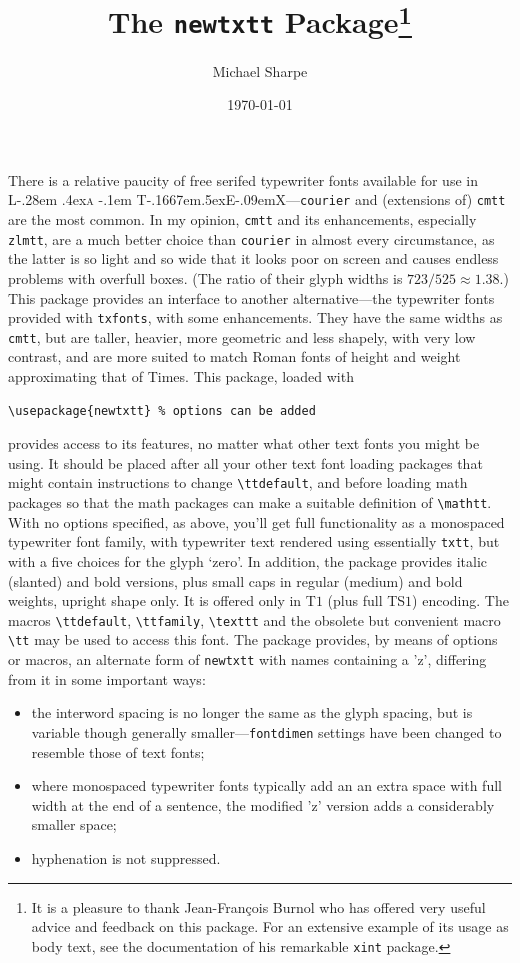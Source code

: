 \documentclass[11pt]{article}
\title{The \texttt{newtxtt} Package\thanks{It is a pleasure to thank Jean-Fran\c{c}ois Burnol who has offered very useful advice and feedback on this package. For an extensive example of its usage as body text, see  the documentation of his remarkable {\tt xint} package.}
}
\author{Michael Sharpe}
\date{\today}  %
\makeatletter
\def\TeX{T\kern-.1667em\lower.5ex\hbox{E}\kern-.09emX\@}
\DeclareRobustCommand{\LaTeX}{L\kern-.28em%
\raise.4ex\hbox{\textsc{a}}%
        \kern-.1em%
        \TeX}
\makeatother
\begin{document}
\maketitle
There is a relative paucity of free serifed typewriter fonts available for use  in \LaTeX---{\tt courier}
 and (extensions of) {\tt cmtt} are the most common.  In my opinion, {\tt cmtt} and its enhancements, especially {\tt zlmtt}, are a much better choice than {\tt courier} in almost every circumstance, as the latter is so light and so wide that it looks poor on screen and causes endless problems with overfull boxes. (The ratio of their glyph widths is $723/525\approx1.38$.) This package provides an interface to another alternative---the typewriter fonts provided with {\tt txfonts}, with some enhancements. They have the same widths as {\tt cmtt}, but are taller, heavier, more geometric and less shapely, with  very low contrast, and are more suited to match Roman fonts of height and weight approximating that of Times. This package, loaded with
\begin{verbatim}
\usepackage{newtxtt} % options can be added
\end{verbatim}
provides access to its features, no matter what other text fonts you might be using. It should be placed after all your other text font loading packages that might contain instructions to change \verb|\ttdefault|, and before loading math packages so that the math packages can make a suitable definition of \verb|\mathtt|. With no options specified, as above, you'll get full functionality as a monospaced typewriter font family, with typewriter text rendered using essentially {\tt txtt}, but with a five choices for the glyph  `zero'. In addition, the package  provides italic (slanted) and bold versions, plus small caps in regular (medium) and bold weights, upright shape only. It is offered  only in T$1$ (plus full TS$1$) encoding. The macros \verb|\ttdefault|, \verb|\ttfamily|, \verb|\texttt| and the obsolete but convenient macro \verb|\tt| may be used to access this font. 
 The package provides, by means of options or macros, an alternate form of {\tt newtxtt} with names containing a {\ttz 'z'}, differing from it in some important ways:
 \begin{itemize}
 \item 
 the interword spacing is no longer the same as the glyph spacing, but is variable though generally smaller---{\tt fontdimen} settings have been changed to resemble those of text fonts;
 \item
where monospaced typewriter fonts typically add an an extra space with full width at the end of a sentence, the modified {\ttz 'z'} version adds a considerably smaller space;
 \item
 hyphenation is not suppressed.
 \end{itemize}
\end{document}
